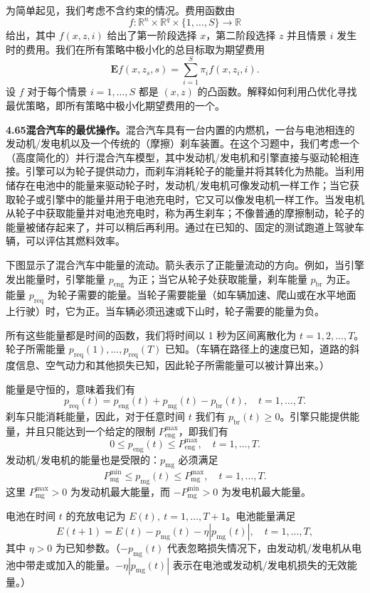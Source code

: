 \documentclass[UTF8,12pt,a4paper,fontset=fandol]{ctexart}
\begin{document}
为简单起见，我们考虑不含约束的情况。费用函数由
\[
f:\mathbb{R}^n\times\mathbb{R}^q\times\{1,\ldots,S\}\to\mathbb{R}
\]
给出，其中 $f(x,z,i)$ 给出了第一阶段选择 $x$，第二阶段选择 $z$ 并且情景 $i$ 发生时的费用。我们在所有策略中极小化的总目标取为期望费用
\[
\mathbf{E}f(x,z_s,s)=\sum_{i=1}^S\pi_if(x,z_i,i).
\]
设 $f$ 对于每个情景 $i=1,\ldots,S$ 都是 $(x,z)$ 的凸函数。解释如何利用凸优化寻找最优策略，即所有策略中极小化期望费用的一个。

\noindent\textbf{4.65\quad 混合汽车的最优操作。}\quad 混合汽车具有一台内置的内燃机，一台与电池相连的发动机/发电机以及一个传统的（摩擦）刹车装置。在这个习题中，我们考虑一个（高度简化的）并行混合汽车模型，其中发动机/发电机和引擎直接与驱动轮相连接。引擎可以为轮子提供动力，而刹车消耗轮子的能量并将其转化为热能。当利用储存在电池中的能量来驱动轮子时，发动机/发电机可像发动机一样工作；当它获取轮子或引擎中的能量并用于电池充电时，它又可以像发电机一样工作。当发电机从轮子中获取能量并对电池充电时，称为再生刹车；不像普通的摩擦制动，轮子的能量被储存起来了，并可以稍后再利用。通过在已知的、固定的测试跑道上驾驶车辆，可以评估其燃料效率。

下图显示了混合汽车中能量的流动。箭头表示了正能量流动的方向。例如，当引擎发出能量时，引擎能量 $p_{\mathrm{eng}}$ 为正；当它从轮子处获取能量，刹车能量 $p_{\mathrm{br}}$ 为正。能量 $p_{\mathrm{req}}$ 为轮子需要的能量。当轮子需要能量（如车辆加速、爬山或在水平地面上行驶）时，它为正。当车辆必须迅速或下山时，轮子需要的能量为负。

所有这些能量都是时间的函数，我们将时间以 1 秒为区间离散化为 $t=1,2,\ldots,T$。轮子所需能量 $p_{\mathrm{req}}(1),\ldots,p_{\mathrm{req}}(T)$ 已知。（车辆在路径上的速度已知，道路的斜度信息、空气动力和其他损失已知，因此轮子所需能量可以被计算出来。）

能量是守恒的，意味着我们有
\[
p_{\mathrm{req}}(t)=p_{\mathrm{eng}}(t)+p_{\mathrm{mg}}(t)-p_{\mathrm{br}}(t),\quad t=1,\ldots,T.
\]
刹车只能消耗能量，因此，对于任意时间 $t$ 我们有 $p_{\mathrm{br}}(t)\geq0$。引擎只能提供能量，并且只能达到一个给定的限制 $P_{\mathrm{eng}}^{\max}$，即我们有
\[
0\leq p_{\mathrm{eng}}(t)\leq P_{\mathrm{eng}}^{\max},\quad t=1,\ldots,T.
\]
发动机/发电机的能量也是受限的：$p_{\mathrm{mg}}$ 必须满足
\[
P_{\mathrm{mg}}^{\min}\leq p_{\mathrm{mg}}(t)\leq P_{\mathrm{mg}}^{\max},\quad t=1,\ldots,T.
\]
这里 $P_{\mathrm{mg}}^{\max}>0$ 为发动机最大能量，而 $-P_{\mathrm{mg}}^{\min}>0$ 为发电机最大能量。

电池在时间 $t$ 的充放电记为 $E(t),\ t=1,\ldots,T+1$。电池能量满足
\[
E(t+1)=E(t)-p_{\mathrm{mg}}(t)-\eta|p_{\mathrm{mg}}(t)|,\quad t=1,\ldots,T,
\]
其中 $\eta>0$ 为已知参数。（$-p_{\mathrm{mg}}(t)$ 代表忽略损失情况下，由发动机/发电机从电池中带走或加入的能量。$-\eta|p_{\mathrm{mg}}(t)|$ 表示在电池或发动机/发电机损失的无效能量。）
\end{document}
